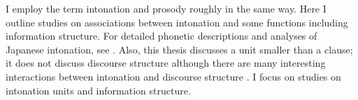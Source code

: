 I employ the term intonation and prosody roughly in the same way.
Here I outline studies on associations between intonation and some functions including information structure.
For detailed phonetic descriptions and analyses of Japanese intonation,
see .
Also, this thesis discusses a unit smaller than a clause;
it does not discuss discourse structure
although there are many interesting interactions between intonation and discourse structure \cite[e.g.,][]{nakajimaallen93,vendittiswerts96,muraiyamashita99,koisoetal03,okuboetal03,koisoishimoto12}.
I focus on 
studies on intonation units and information structure.

